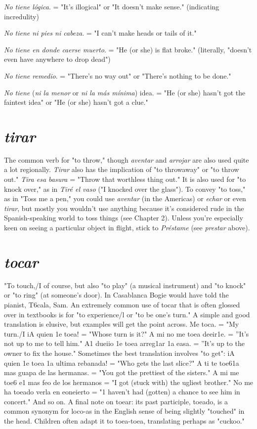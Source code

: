 \documentclass[14pt,a4paper,oneside]{memoir}
\newcommand{\indu}{\hspace{20pt}}
\begin{document}
\indu \emph{No tiene lógica}. = "It's illogical" or "It doesn't make sense."
(indicating incredulity)

\indu \emph{No tiene ni pies ni cabeza}. = "I can't make heads or tails of it."

\indu \emph{No tiene en donde caerse muerto}. = "He (or she) is flat
broke."
(literally, "doesn't even have anywhere to drop dead")

\indu \emph{No tiene remedio}. = "There's no way out" or "There's nothing to be done."

\indu \emph{No tiene} (\emph{ni la menor} or \emph{ni la más mínima}) idea. = "He (or
she) hasn't got the faintest idea" or "He (or she) hasn't
got a clue."

\section{\emph{tirar}}

The common verb for "to throw," though \emph{aventar} and \emph{arrojar}
are also used quite a lot regionally. \emph{Tirar} also has the implication of
"to throwaway" or "to throw out." \emph{Tira esa basura} = "Throw that
worthless thing out." It is also used for "to knock over," as in \emph{Tiré el
vaso} ("I knocked over the glass"). To convey "to toss," as in "Toss me
a pen," you could use \emph{aventar} (in the Americas) or \emph{echar} or even \emph{tirar},
but mostly you wouldn't use anything because it's considered rude
in the Spanish-speaking world to toss things (see Chapter 2). Unless
you're especially keen on seeing a particular object in flight, stick to
\emph{Préstame} (see \emph{prestar} above).

\section{\emph{tocar}}

"To touch,/I of course, but also "to play" (a musical instrument) and "to knock" or "to ring" (at someone's door). In Casablanca
Bogie would have told the pianist, T6cala, Sam. An extremely common use of tocar that is often glossed over in textbooks is for "to experience/l or "to be one's turn." A simple and good translation is elusive,
but examples will get the point across. Me toca. = "My turn./I iA
quien 1e toea! = "Whose turn is it?" A mi no me toea deeir1e. = ''It's
not up to me to tell him." A1 dueiio 1e toea arreg1ar 1a easa. = ''It's
up to the owner to fix the house." Sometimes the best translation involves "to get": iA quien 1e toea 1a ultima rebanada! = "Who gets the
last slice?" A ti te toe61a mas guapa de las hermanas. = "You got the
prettiest of the sisters." A mi me toe6 e1 mas feo de los hermanos =
"I got (stuck with) the ugliest brother." No me ha toeado verla en eoneierto = "1 haven't had (gotten) a chance to see him in concert." And
so on. A final note on toear: its past participle, toeado, is a common
synonym for loco-as in the English sense of being slightly "touched"
in the head. Children often adapt it to toea-toea, translating perhaps as
"cuckoo."
\end{document}

